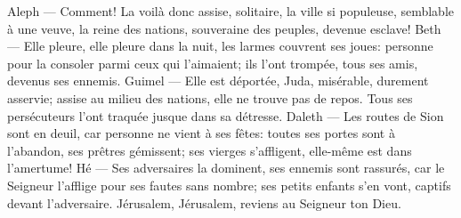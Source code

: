 Aleph --- Comment! La voilà donc assise, solitaire, la ville si populeuse,
	semblable à une veuve, la reine des nations,
	souveraine des peuples, devenue esclave!
Beth --- Elle pleure, elle pleure dans la nuit, les larmes couvrent ses joues:
	personne pour la consoler parmi ceux qui l’aimaient;
	ils l’ont trompée, tous ses amis, devenus ses ennemis.
Guimel --- Elle est déportée, Juda, misérable, durement asservie;
	assise au milieu des nations, elle ne trouve pas de repos.
	Tous ses persécuteurs l’ont traquée jusque dans sa détresse.
Daleth --- Les routes de Sion sont en deuil, car personne ne vient à ses fêtes:
	toutes ses portes sont à l’abandon, ses prêtres gémissent;
	ses vierges s’affligent, elle-même est dans l’amertume!
Hé --- Ses adversaires la dominent, ses ennemis sont rassurés,
	car le Seigneur l’afflige pour ses fautes sans nombre;
	ses petits enfants s’en vont, captifs devant l’adversaire.
Jérusalem, Jérusalem, reviens au Seigneur ton Dieu.
